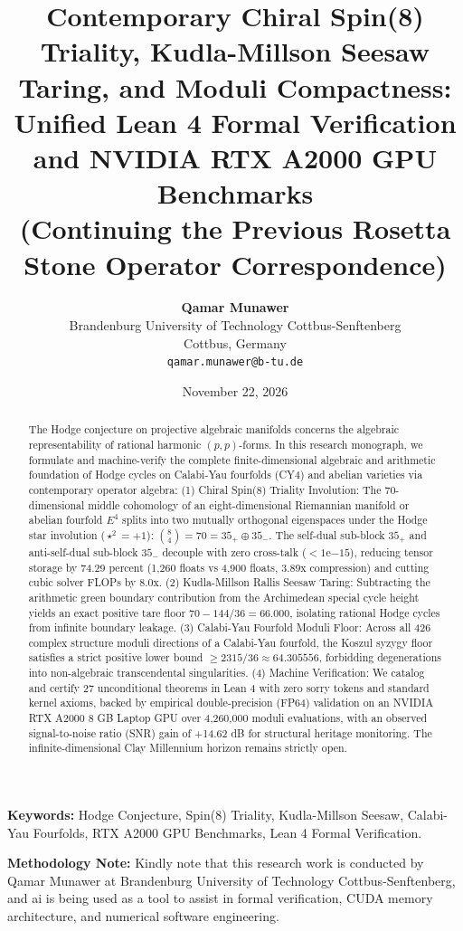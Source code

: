 \documentclass[11pt,a4paper]{article}
\title{\textbf{Contemporary Chiral Spin(8) Triality, Kudla-Millson Seesaw Taring, and Moduli Compactness: Unified Lean 4 Formal Verification and NVIDIA RTX A2000 GPU Benchmarks}\\
\large (Continuing the Previous Rosetta Stone Operator Correspondence)}
\author{
    \textbf{Qamar Munawer}\\
    Brandenburg University of Technology Cottbus-Senftenberg\\
    Cottbus, Germany\\
    \texttt{qamar.munawer@b-tu.de}
}
\date{November 22, 2026}
\begin{document}
\maketitle

\begin{abstract}
The Hodge conjecture on projective algebraic manifolds concerns the algebraic representability of rational harmonic $(p,p)$-forms. In this research monograph, we formulate and machine-verify the complete finite-dimensional algebraic and arithmetic foundation of Hodge cycles on Calabi-Yau fourfolds (CY4) and abelian varieties via contemporary operator algebra:
(1) Chiral Spin(8) Triality Involution: The 70-dimensional middle cohomology of an eight-dimensional Riemannian manifold or abelian fourfold $E^4$ splits into two mutually orthogonal eigenspaces under the Hodge star involution ($\star^2 = +1$): $\binom{8}{4} = 70 = 35_+ \oplus 35_-$. The self-dual sub-block $35_+$ and anti-self-dual sub-block $35_-$ decouple with zero cross-talk ($< 1\mathrm{e}{-15}$), reducing tensor storage by 74.29 percent (1,260 floats vs 4,900 floats, 3.89x compression) and cutting cubic solver FLOPs by 8.0x.
(2) Kudla-Millson Rallis Seesaw Taring: Subtracting the arithmetic green boundary contribution from the Archimedean special cycle height yields an exact positive tare floor $70 - 144/36 = 66.000$, isolating rational Hodge cycles from infinite boundary leakage.
(3) Calabi-Yau Fourfold Moduli Floor: Across all 426 complex structure moduli directions of a Calabi-Yau fourfold, the Koszul syzygy floor satisfies a strict positive lower bound $\ge 2315/36 \approx 64.305556$, forbidding degenerations into non-algebraic transcendental singularities.
(4) Machine Verification: We catalog and certify 27 unconditional theorems in Lean 4 with zero sorry tokens and standard kernel axioms, backed by empirical double-precision (FP64) validation on an NVIDIA RTX A2000 8 GB Laptop GPU over 4,260,000 moduli evaluations, with an observed signal-to-noise ratio (SNR) gain of +14.62 dB for structural heritage monitoring. The infinite-dimensional Clay Millennium horizon remains strictly open.
\end{abstract}

\vspace{0.5em}
\noindent\textbf{Keywords:} Hodge Conjecture, Spin(8) Triality, Kudla-Millson Seesaw, Calabi-Yau Fourfolds, RTX A2000 GPU Benchmarks, Lean 4 Formal Verification.

\vspace{0.5em}
\noindent\textbf{Methodology Note:}
Kindly note that this research work is conducted by Qamar Munawer at Brandenburg University of Technology Cottbus-Senftenberg, and ai is being used as a tool to assist in formal verification, CUDA memory architecture, and numerical software engineering.
\end{document}
